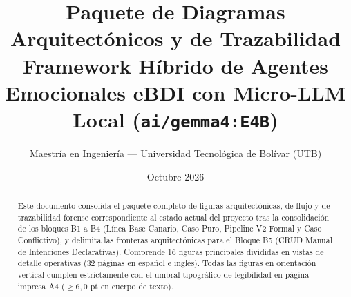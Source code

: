 \documentclass[11pt,a4paper]{article}
\begin{document}
\title{\textbf{Paquete de Diagramas Arquitectónicos y de Trazabilidad}\\[0.5em]\large Framework Híbrido de Agentes Emocionales eBDI con Micro-LLM Local (\texttt{ai/gemma4:E4B})}
\author{Maestría en Ingeniería --- Universidad Tecnológica de Bolívar (UTB)}
\date{Octubre 2026}
\maketitle
\thispagestyle{empty}

\begin{abstract}
Este documento consolida el paquete completo de figuras arquitectónicas, de flujo y de trazabilidad forense correspondiente al estado actual del proyecto tras la consolidación de los bloques B1 a B4 (Línea Base Canario, Caso Puro, Pipeline V2 Formal y Caso Conflictivo), y delimita las fronteras arquitectónicas para el Bloque B5 (CRUD Manual de Intenciones Declarativas). Comprende 16 figuras principales divididas en vistas de detalle operativas (32 páginas en español e inglés). Todas las figuras en orientación vertical cumplen estrictamente con el umbral tipográfico de legibilidad en página impresa A4 ($\ge 6{,}0\text{ pt}$ en cuerpo de texto).
\end{abstract}

\clearpage


\end{document}
